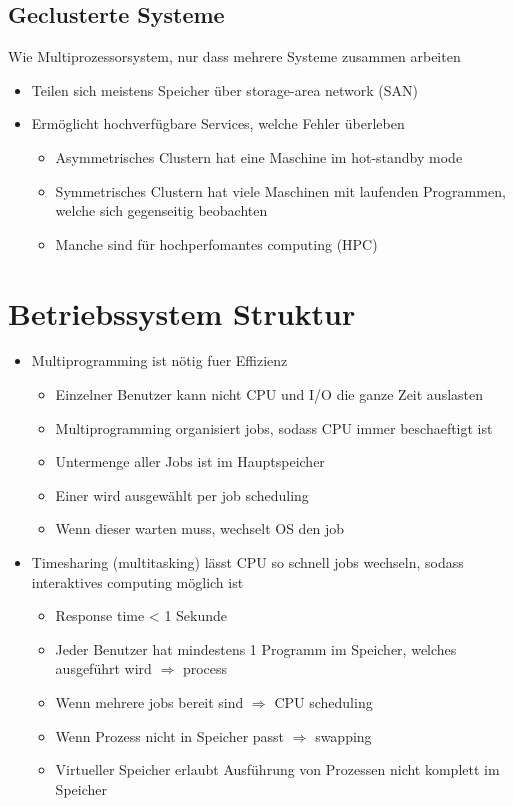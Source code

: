 \documentclass[a4paper]{scrreprt}
\begin{document}
\subsection{Geclusterte Systeme}
Wie Multiprozessorsystem, nur dass mehrere Systeme zusammen arbeiten

\begin{itemize}
	\item Teilen sich meistens Speicher über storage-area network (SAN)
	\item Ermöglicht hochverfügbare Services, welche Fehler überleben
		\begin{itemize}
			\item Asymmetrisches Clustern hat eine Maschine im hot-standby mode
			\item Symmetrisches Clustern hat viele Maschinen mit laufenden Programmen, welche sich gegenseitig beobachten
			\item Manche sind für hochperfomantes computing (HPC)
		\end{itemize}
\end{itemize}

\section{Betriebssystem Struktur}
\begin{itemize}
	\item Multiprogramming ist nötig fuer Effizienz
		\begin{itemize}
			\item Einzelner Benutzer kann nicht CPU und I/O die ganze Zeit auslasten
			\item Multiprogramming organisiert jobs, sodass CPU immer beschaeftigt ist
			\item Untermenge aller Jobs ist im Hauptspeicher
			\item Einer wird ausgewählt per job scheduling
			\item Wenn dieser warten muss, wechselt OS den job
		\end{itemize}
	\item Timesharing (multitasking) lässt CPU so schnell jobs wechseln, sodass interaktives computing möglich ist
		\begin{itemize}
			\item Response time < 1 Sekunde
			\item Jeder Benutzer hat mindestens 1 Programm im Speicher, welches ausgeführt wird $\Rightarrow$ process
			\item Wenn mehrere jobs bereit sind $\Rightarrow$ CPU scheduling
			\item Wenn Prozess nicht in Speicher passt $\Rightarrow$ swapping
			\item Virtueller Speicher erlaubt Ausführung von Prozessen nicht komplett im Speicher
		\end{itemize}
\end{itemize}
\end{document}
